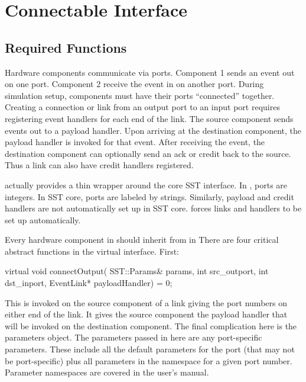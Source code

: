 
\chapter{\sstmacro Connectable Interface}\label{chapter:Connectables}

\section{Required Functions}
\label{sec:requiredFunctions}

Hardware components communicate via ports. Component 1 sends an event out on one port.
Component 2 receive the event in on another port.
During simulation setup, components must have their ports ``connected'' together.
Creating a connection or link from an output port to an input port requires registering event handlers for each end of the link.
The source component sends events out to a payload handler. 
Upon arriving at the destination component, the payload handler is invoked for that event.
After receiving the event, the destination component can optionally send an ack or credit back to the source.
Thus a link can also have credit handlers registered.

\sstmacro actually provides a thin wrapper around the core SST interface.
In \sstmacro, ports are integers.
In SST core, ports are labeled by strings.
Similarly, payload and credit handlers are not automatically set up in SST core.
\sstmacro forces links and handlers to be set up automatically.

Every hardware component in \sstmacro should inherit from  in 
There are four critical abstract functions in the virtual interface. First:

\begin{CppCode}
  virtual void connectOutput(
    SST::Params& params,
    int src_outport,
    int dst_inport,
    EventLink* payloadHandler) = 0;
\end{CppCode}
This is invoked on the source component of a link giving the port numbers on either end of the link.
It gives the source component the payload handler that will be invoked on the destination component.
The final complication here is the parameters object.
The parameters passed in here are any port-specific parameters.
These include all the default parameters for the port (that may not be port-specific)
plus all parameters in the namespace  for a given port number.
Parameter namespaces are covered in the user's manual.

